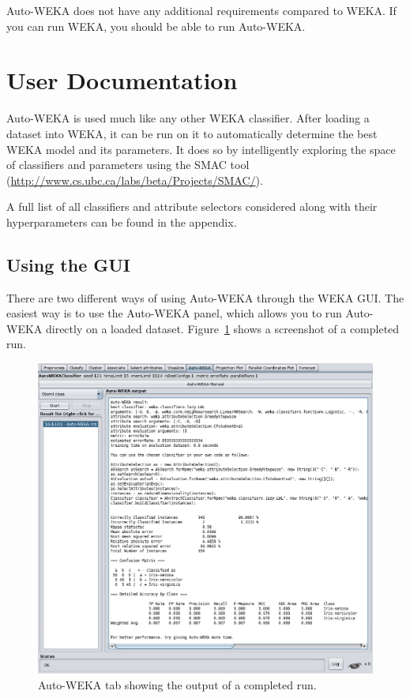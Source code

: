 \documentclass{article}
\begin{document}
Auto-WEKA does not have any additional requirements compared to WEKA. If you can
run WEKA, you should be able to run Auto-WEKA.

\section{User Documentation}\label{sec:overview}

Auto-WEKA is used much like any other WEKA classifier. After loading a dataset
into WEKA, it can be run on it to automatically determine the best WEKA model
and its parameters. It does so by intelligently exploring the space of
classifiers and parameters using the SMAC tool (\url{http://www.cs.ubc.ca/labs/beta/Projects/SMAC/}).

A full list of all classifiers and attribute selectors considered along with
their hyperparameters can be found in the appendix.

\subsection{Using the GUI}\label{sec:gui}

There are two different ways of using Auto-WEKA through the WEKA GUI. The
easiest way is to use the Auto-WEKA panel, which allows you to run Auto-WEKA
directly on a loaded dataset. Figure~\ref{fig:tab} shows a screenshot of a
completed run.

\begin{figure}[!ht]
\begin{center}
\includegraphics[width=\textwidth]{tab}
\caption{Auto-WEKA tab showing the output of a completed run.}
\label{fig:tab}
\end{center}
\end{figure}
\end{document}
